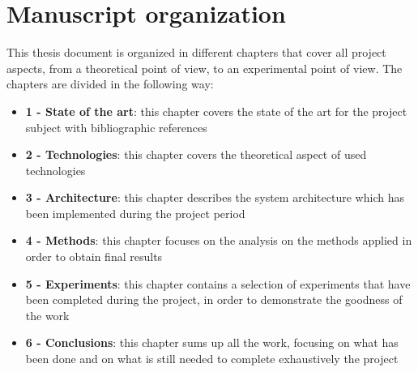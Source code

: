 \documentclass[\main/main.tex]{subfiles}
\begin{document}
\section*{Manuscript organization}
This thesis document is organized in different chapters that cover all project aspects, from a theoretical point of view, to an experimental point of view.
The chapters are divided in the following way:
\begin{itemize}
    \item \textbf{1 - State of the art}: this chapter covers the state of the art for the project subject with bibliographic references
    \item \textbf{2 - Technologies}: this chapter covers the theoretical aspect of used technologies
    \item \textbf{3 - Architecture}: this chapter describes the system architecture which has been implemented during the project period
    \item \textbf{4 - Methods}: this chapter focuses on the analysis on the methods applied in order to obtain final results
    \item \textbf{5 - Experiments}: this chapter contains a selection of experiments that have been completed during the project, in order to demonstrate the goodness of the work
    \item \textbf{6 - Conclusions}: this chapter sums up all the work, focusing on what has been done and on what is still needed to complete exhaustively the project
\end{itemize}
\end{document}
